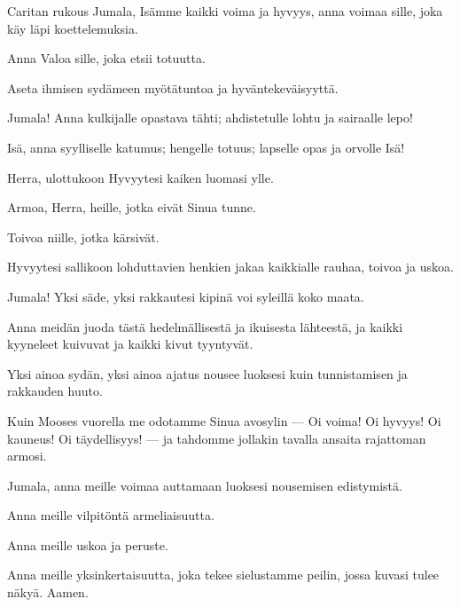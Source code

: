   \begin{passage}[FI]{Caritan rukous}
    Jumala, Isämme kaikki voima ja hyvyys, anna voimaa sille, joka käy läpi koettelemuksia.
    \par
    Anna Valoa sille, joka etsii totuutta.
    \par
    Aseta ihmisen sydämeen myötätuntoa ja hyväntekeväisyyttä.
    \par
    Jumala! Anna kulkijalle opastava tähti;
    ahdistetulle lohtu ja sairaalle lepo!
    \par
    Isä, anna syylliselle katumus; hengelle totuus;
    lapselle opas ja orvolle Isä!
    \par
    Herra, ulottukoon Hyvyytesi kaiken luomasi ylle.
    \par
    Armoa, Herra, heille, jotka eivät Sinua tunne.
    \par
    Toivoa niille, jotka kärsivät.
    \par
    Hyvyytesi sallikoon lohduttavien henkien jakaa
    kaikkialle rauhaa, toivoa ja uskoa.
    \par
    Jumala! Yksi säde, yksi rakkautesi kipinä voi
    syleillä koko maata.
    \par
    Anna meidän juoda tästä hedelmällisestä ja
    ikuisesta lähteestä, ja kaikki kyyneleet kuivuvat
    ja kaikki kivut tyyntyvät.
    \par
    Yksi ainoa sydän, yksi ainoa ajatus nousee
    luoksesi kuin tunnistamisen ja rakkauden
    huuto.
    \par
    Kuin Mooses vuorella me odotamme Sinua
    avosylin --- Oi voima! Oi hyvyys! Oi kauneus!
    Oi täydellisyys! --- ja tahdomme jollakin tavalla
    ansaita rajattoman armosi.
    \par
    Jumala, anna meille voimaa auttamaan luoksesi nousemisen edistymistä.
    \par
    Anna meille vilpitöntä armeliaisuutta.
    \par
    Anna meille uskoa ja peruste.
    \par
    Anna meille yksinkertaisuutta, joka tekee sielustamme peilin,
    jossa kuvasi tulee näkyä.
    Aamen.
  \end{passage}
\endsong


